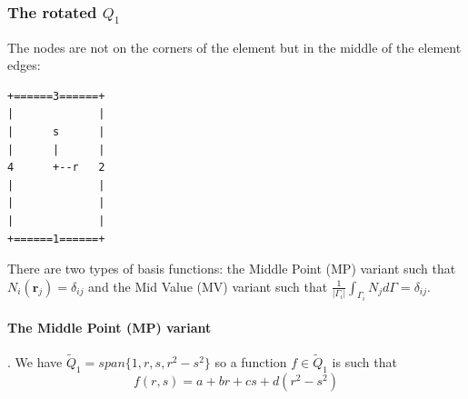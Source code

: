 \subsubsection{The rotated $Q_1$} \label{ss:rq1}

The nodes are not on the corners of the element but in the middle of the
element edges:
\begin{verbatim}
+======3======+
|             |
|      s      |
|      |      |
4      +--r   2
|             |
|             |
|             |
+======1======+
\end{verbatim}

There are two types of basis functions: the Middle Point (MP) variant
such that $N_i({\bm r}_j)=\delta_{ij}$ and the Mid Value (MV) variant
such that $\frac{1}{|\Gamma_i|} \int_{\Gamma_i} N_j d\Gamma = \delta_{ij}$.

\paragraph{The Middle Point (MP) variant}. 
We have $\tilde{Q}_1=span \{ 1,r,s,r^2-s^2 \}$
so a function $f \in \tilde{Q}_1$  is such that 
\begin{equation}
f(r,s)= a + b r + c s + d(r^2-s^2 )
\label{nonpsf}
\end{equation}

